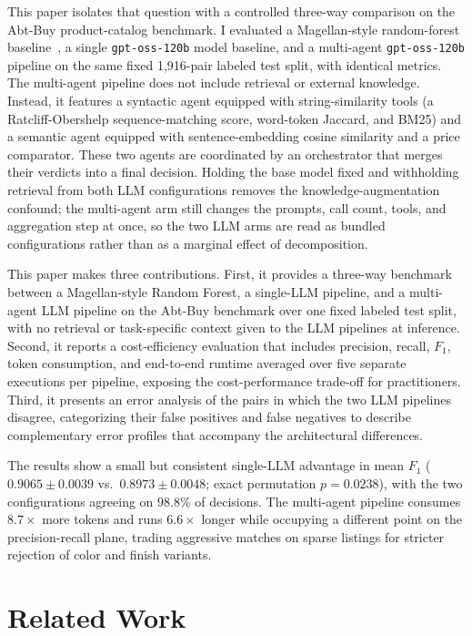 \documentclass[sigconf]{acmart}
\begin{document}
This paper isolates that question with a controlled three-way comparison on the Abt-Buy product-catalog benchmark.
I evaluated a Magellan-style random-forest baseline~\cite{konda2016magellan}, a single \texttt{gpt-oss-120b} model baseline, and a multi-agent \texttt{gpt-oss-120b} pipeline on the same fixed 1,916-pair labeled test split, with identical metrics.
The multi-agent pipeline does not include retrieval or external knowledge.
Instead, it features a syntactic agent equipped with string-similarity tools (a Ratcliff-Obershelp sequence-matching score, word-token Jaccard, and BM25) and a semantic agent equipped with sentence-embedding cosine similarity and a price comparator.
These two agents are coordinated by an orchestrator that merges their verdicts into a final decision.
Holding the base model fixed and withholding retrieval from both LLM configurations removes the knowledge-augmentation confound; the multi-agent arm still changes the prompts, call count, tools, and aggregation step at once, so the two LLM arms are read as bundled configurations rather than as a marginal effect of decomposition.

This paper makes three contributions.
First, it provides a three-way benchmark between a Magellan-style Random Forest, a single-LLM pipeline, and a multi-agent LLM pipeline on the Abt-Buy benchmark over one fixed labeled test split, with no retrieval or task-specific context given to the LLM pipelines at inference.
Second, it reports a cost-efficiency evaluation that includes precision, recall, $F_1$, token consumption, and end-to-end runtime averaged over five separate executions per pipeline, exposing the cost-performance trade-off for practitioners.
Third, it presents an error analysis of the pairs in which the two LLM pipelines disagree, categorizing their false positives and false negatives to describe complementary error profiles that accompany the architectural differences.

The results show a small but consistent single-LLM advantage in mean $F_1$ ($0.9065 \pm 0.0039$ vs.\ $0.8973 \pm 0.0048$; exact permutation $p = 0.0238$), with the two configurations agreeing on $98.8\%$ of decisions.
The multi-agent pipeline consumes $8.7\times$ more tokens and runs $6.6\times$ longer while occupying a different point on the precision-recall plane, trading aggressive matches on sparse listings for stricter rejection of color and finish variants.


\section{Related Work}
\label{sec:related}
\end{document}
